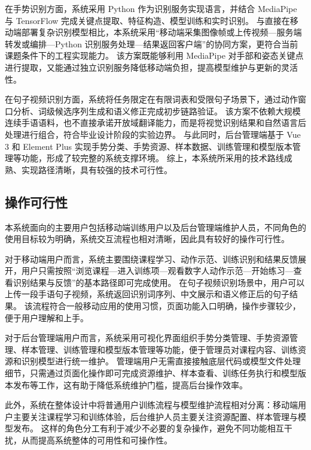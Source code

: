 在手势识别方面，系统采用 Python 作为识别服务实现语言，并结合 MediaPipe 与 TensorFlow 完成关键点提取、特征构造、模型训练和实时识别。
与直接在移动端部署复杂识别模型相比，本系统采用“移动端采集图像帧或上传视频—服务端转发或编排—Python 识别服务处理—结果返回客户端”的协同方案，更符合当前课题条件下的工程实现能力。
该方案既能够利用 MediaPipe 对手部和姿态关键点进行提取，又能通过独立识别服务降低移动端负担，提高模型维护与更新的灵活性\cite{lugaresi-mediapipe-2019,zhang-mediapipe-hands-2020}。

在句子视频识别方面，系统将任务限定在有限词表和受限句子场景下，通过动作窗口分析、词级候选序列生成和语义修正完成初步链路验证。
该方案不依赖大规模连续手语语料，也不直接承诺开放域翻译能力，而是将视觉识别结果和自然语言后处理进行组合，符合毕业设计阶段的实验边界。
与此同时，后台管理端基于 Vue 3 和 Element Plus 实现手势分类、手势资源、样本数据、训练管理和模型版本管理等功能，形成了较完整的系统支撑环境。
综上，本系统所采用的技术路线成熟、实现路径清晰，具有较强的技术可行性。

\subsection{操作可行性}

本系统面向的主要用户包括移动端训练用户以及后台管理端维护人员，不同角色的使用目标较为明确，系统交互流程也相对清晰，因此具有较好的操作可行性。

对于移动端用户而言，系统主要围绕课程学习、动作示范、训练识别和结果反馈展开，用户只需按照“浏览课程—进入训练项—观看数字人动作示范—开始练习—查看识别结果与反馈”的基本路径即可完成使用。
在句子视频识别场景中，用户可以上传一段手语句子视频，系统返回识别词序列、中文展示和语义修正后的句子结果。
该流程符合一般移动应用的使用习惯，页面功能入口明确，操作步骤较少，便于用户理解和上手。

对于后台管理端用户而言，系统采用可视化界面组织手势分类管理、手势资源管理、样本管理、训练管理和模型版本管理等功能，便于管理员对课程内容、训练资源和识别模型进行统一维护。
管理端用户无需直接接触底层代码或模型文件处理细节，只需通过页面化操作即可完成资源维护、样本查看、训练任务执行和模型版本发布等工作，这有助于降低系统维护门槛，提高后台操作效率。

此外，系统在整体设计中将普通用户训练流程与模型维护流程相对分离：移动端用户主要关注课程学习和训练体验，后台维护人员主要关注资源配置、样本管理与模型发布。
这样的角色分工有利于减少不必要的复杂操作，避免不同功能相互干扰，从而提高系统整体的可用性和可操作性。
